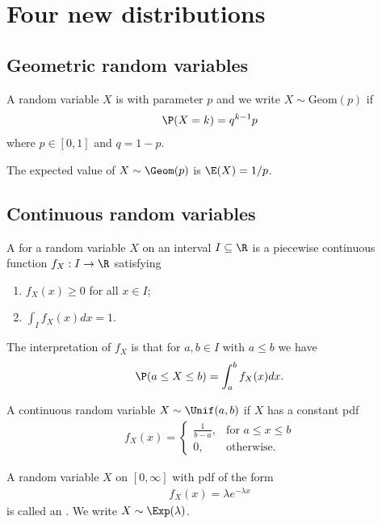 \documentclass{article}
\begin{document}
\section{Four new distributions}
\subsection{Geometric random variables}
\begin{definition}
    A random variable $X$ is  with parameter $p$ and we write $X\sim \text{Geom}(p)$ if
    \begin{align*}
        \P(X=k)=q^{k-1}p
    \end{align*}
    where $p\in[0,1]$ and $q=1-p$.
\end{definition}
\begin{proposition}
    The expected value of $X\sim\Geom(p)$ is $\E(X)=1/p$.
\end{proposition}
\subsection{Continuous random variables}
\begin{definition}
    A  for a random variable $X$ on an
    interval $I\subseteq\R$ is a piecewise continuous function $f_X:I\to\R$ satisfying
    \begin{enumerate}
        \item $f_X(x) \geq 0$ for all $x\in I$;
        \item $\int_I f_X(x) dx =1$.
    \end{enumerate}
    The interpretation of $f_X$ is that for $a,b\in I$ with $a\leq b$ we have
    \begin{align*}
        \P(a\leq X\leq b)=\int_a^b f_X(x)dx.
    \end{align*}
\end{definition}
\begin{definition}
    A continuous random variable $X\sim\Unif(a,b)$ if $X$ has a constant pdf
    \begin{align*}
        f_X(x) = \begin{cases}
            \frac{1}{b-a}, &\text{for }a\leq x\leq b\\
            0, &\text{otherwise.}
        \end{cases}
    \end{align*}
\end{definition}
\begin{definition}
    A random variable $X$ on $[0,\infty]$ with pdf of the form
    \begin{align*}
        f_X(x) = \lambda e^{-\lambda x}
    \end{align*}
    is called an .
    We write $X\sim\Exp(\lambda)$.
\end{definition}
\end{document}
